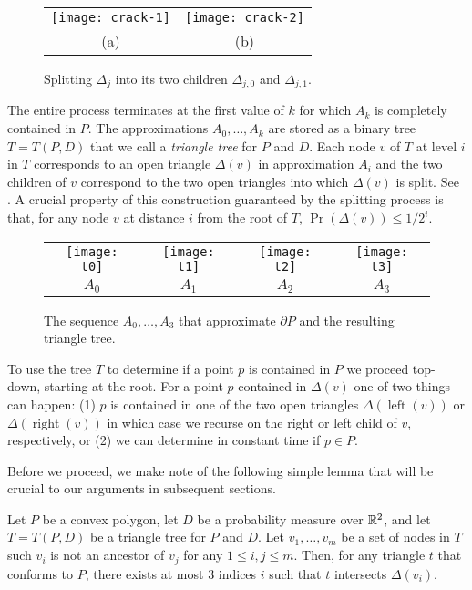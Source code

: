 \documentclass[charterfonts,lotsofwhite]{patmorin}
\newcommand{\boundary}{\partial}
\DeclareMathOperator{\lft}{left}
\DeclareMathOperator{\rght}{right}
\begin{document}
\begin{figure}
\begin{center}
\begin{tabular}{cc}
\texttt{[image: crack-1]} & \texttt{[image: crack-2]} \\
(a) & (b)
\end{tabular}
\end{center}
\caption{Splitting $\Delta_j$ into its two children $\Delta_{j,0}$ and
$\Delta_{j,1}$.}
\end{figure}

The entire process terminates at the first value of $k$ for which
$A_k$ is completely contained in $P$.  The approximations
$A_0,\ldots,A_k$ are stored as a binary tree $T=T(P,D)$ that we call a
\emph{triangle tree} for $P$ and $D$.  Each node $v$ of $T$ at level
$i$ in $T$ corresponds to an open triangle $\Delta(v)$ in
approximation $A_{i}$ and the two children of $v$ correspond to the
two open triangles into which $\Delta(v)$ is split. See .
A crucial property of this construction guaranteed by the splitting
process is that, for any node $v$ at distance $i$ from the root
of $T$, $\Pr(\Delta(v))\le 1/2^i$.

\begin{figure}
  \begin{center}
    \begin{tabular}{cccc}
      \texttt{[image: t0]} & 
      \texttt{[image: t1]} & 
      \texttt{[image: t2]} & 
      \texttt{[image: t3]} \\
      $A_0$ & $A_1$ & $A_2$ & $A_3$ 
    \end{tabular}
  \end{center}
  \caption{The sequence $A_0,\ldots,A_3$ that approximate $\boundary
P$ and the resulting triangle tree.}
\end{figure}

To use the tree $T$ to determine if a point $p$ is contained in $P$ we
proceed top-down, starting at the root.  For a point $p$ contained in
$\Delta(v)$ one of two things can happen: (1) $p$ is contained in one
of the two open triangles $\Delta(\lft(v))$ or $\Delta(\rght(v))$ in
which case we recurse on the right or left child of $v$, respectively,
or (2) we can determine in constant time if $p\in P$.

Before we proceed, we make note of the following simple lemma that
will be crucial to our arguments in subsequent sections.

\begin{lem}
Let $P$ be a convex polygon, let $D$ be a probability measure over
$\mathbb{R}^2$, and let $T=T(P,D)$ be a triangle tree for $P$ and $D$.
Let $v_1,\ldots,v_m$ be a set of nodes in $T$ such $v_i$ is not an
ancestor of $v_j$ for any $1\le i,j\le m$.  Then, for any triangle
$t$ that conforms to $P$, there exists at most $3$ indices $i$ such that
$t$ intersects $\Delta(v_i)$.
\end{lem}
\end{document}

